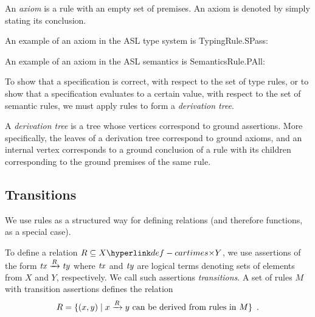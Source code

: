 \begin{definition}[Axiom]
An \emph{axiom} is a rule with an empty set of premises.
An axiom is denoted by simply stating its conclusion.
\end{definition}

An example of an axiom in the ASL type system is TypingRule.SPass:
\begin{mathpar}
\end{mathpar}
\hypertarget{SemanticsRule.PAll-example}{}
An example of an axiom in the ASL semantics is SemanticsRule.PAll:
\begin{mathpar}
\end{mathpar}

To show that a specification is correct, with respect to the set of type rules,
or to show that a specification evaluates to a certain value, with respect to
the set of semantic rules, we must apply rules to form a \emph{derivation tree}.

\hypertarget{def-derivationtree}{}
\begin{definition}
  A \emph{derivation tree} is a tree whose vertices correspond to ground assertions.
  More specifically, the leaves of a derivation tree correspond to ground axioms,
  and an internal vertex corresponds to a ground conclusion of a rule with its children
  corresponding to the ground premises of the same rule.
\end{definition}


\subsection{Transitions\label{sec:transitions}}

We use rules as a structured way for defining relations (and therefore functions, as a special case).

To define a relation $R \subseteq X \cartimes Y$, we use assertions of the form $\termx \rulearrow \termy$
where $\termx$ and $\termy$ are logical terms denoting sets of elements from $X$ and $Y$, respectively.
%
We call such assertions \emph{transitions}.
A set of rules $M$ with transition assertions defines the relation
\[
    R = \{ (x,y) \;|\; x \rulearrow y \text{ can be derived from rules in } M\} \enspace.
\]

